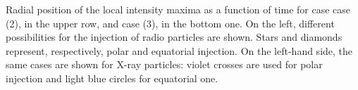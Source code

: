Radial position of the local intensity maxima as a function of time for case case (2), in the upper row, and case (3), in the bottom one. On the left, different possibilities for the injection of radio particles are shown. Stars and diamonds represent, respectively, polar and equatorial injection. On the left-hand side, the same cases are shown for X-ray particles: violet crosses are used for polar injection and light blue circles for equatorial one. 
\label{fig:wisp2}